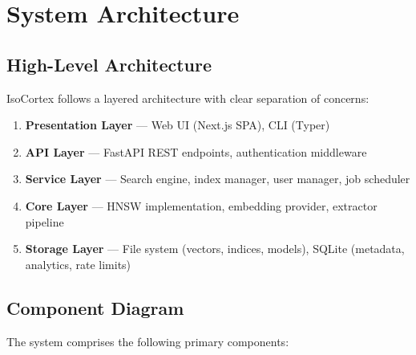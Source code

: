 \documentclass[11pt,a4paper]{article}
\begin{document}
\section{System Architecture}

\subsection{High-Level Architecture}

IsoCortex follows a layered architecture with clear separation of concerns:

\begin{reqbox}
\begin{enumerate}
    \item \textbf{Presentation Layer} --- Web UI (Next.js SPA), CLI (Typer)
    \item \textbf{API Layer} --- FastAPI REST endpoints, authentication middleware
    \item \textbf{Service Layer} --- Search engine, index manager, user manager, job scheduler
    \item \textbf{Core Layer} --- HNSW implementation, embedding provider, extractor pipeline
    \item \textbf{Storage Layer} --- File system (vectors, indices, models), SQLite (metadata, analytics, rate limits)
\end{enumerate}
\end{reqbox}

\subsection{Component Diagram}

The system comprises the following primary components:
\end{document}
